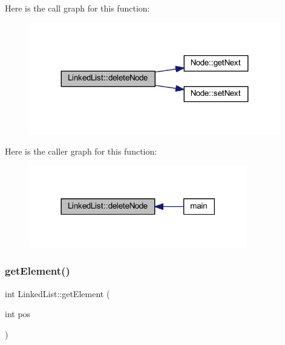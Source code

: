 Here is the call graph for this function\+:
\nopagebreak
\begin{figure}[H]
\begin{center}
\leavevmode
\includegraphics[width=311pt]{class_linked_list_a9a53a4d26d1c757f3d526db3fa43c2f8_cgraph}
\end{center}
\end{figure}
Here is the caller graph for this function\+:
\nopagebreak
\begin{figure}[H]
\begin{center}
\leavevmode
\includegraphics[width=270pt]{class_linked_list_a9a53a4d26d1c757f3d526db3fa43c2f8_icgraph}
\end{center}
\end{figure}
\mbox{\label{class_linked_list_a2866982bfe5f87a2a265d1e2ec3e43ed}} 
\subsubsection{\texorpdfstring{get\+Element()}{getElement()}}
{\footnotesize\ttfamily int Linked\+List\+::get\+Element (\begin{DoxyParamCaption}\item[{int}]{pos }\end{DoxyParamCaption})}

